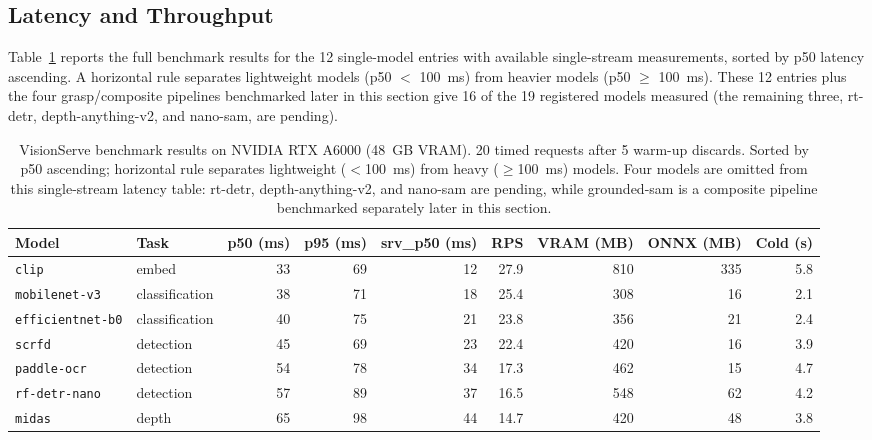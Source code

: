 \subsection{Latency and Throughput}
\label{sec:eval:latency}

Table~\ref{tab:benchmark} reports the full benchmark results for the 12 single-model
entries with available single-stream measurements, sorted by p50 latency ascending.  A
horizontal rule separates lightweight models (p50 $<$ 100~ms) from heavier models
(p50 $\geq$ 100~ms).  These 12 entries plus the four grasp/composite pipelines benchmarked
later in this section give 16 of the 19 registered models measured (the remaining three,
rt-detr, depth-anything-v2, and nano-sam, are pending).

\begin{table}[t]
  \centering
  \small
  \caption{%
    VisionServe benchmark results on NVIDIA RTX A6000 (48~GB VRAM).
    20 timed requests after 5 warm-up discards.
    Sorted by p50 ascending; horizontal rule separates lightweight ($<$100~ms)
    from heavy ($\geq$100~ms) models.
    Four models are omitted from this single-stream latency table: rt-detr,
    depth-anything-v2, and nano-sam are pending, while grounded-sam is a composite
    pipeline benchmarked separately later in this section.%
  }
  \label{tab:benchmark}
  \begin{tabular}{llrrrrrrr}
    \toprule
    \textbf{Model} & \textbf{Task}
      & \textbf{p50 (ms)} & \textbf{p95 (ms)}
      & \textbf{srv\_p50 (ms)} & \textbf{RPS}
      & \textbf{VRAM (MB)} & \textbf{ONNX (MB)} & \textbf{Cold (s)} \\
    \midrule
    \texttt{clip}          & embed          &  33 &  69 &  12 & 27.9 &  810 & 335 & 5.8 \\
    \texttt{mobilenet-v3}  & classification &  38 &  71 &  18 & 25.4 &  308 &  16 & 2.1 \\
    \texttt{efficientnet-b0}& classification&  40 &  75 &  21 & 23.8 &  356 &  21 & 2.4 \\
    \texttt{scrfd}         & detection      &  45 &  69 &  23 & 22.4 &  420 &  16 & 3.9 \\
    \texttt{paddle-ocr}    & detection      &  54 &  78 &  34 & 17.3 &  462 &  15 & 4.7 \\
    \texttt{rf-detr-nano}  & detection      &  57 &  89 &  37 & 16.5 &  548 &  62 & 4.2 \\
    \texttt{midas}         & depth          &  65 &  98 &  44 & 14.7 &  420 &  48 & 3.8 \\

\end{tabular}
\end{table}
